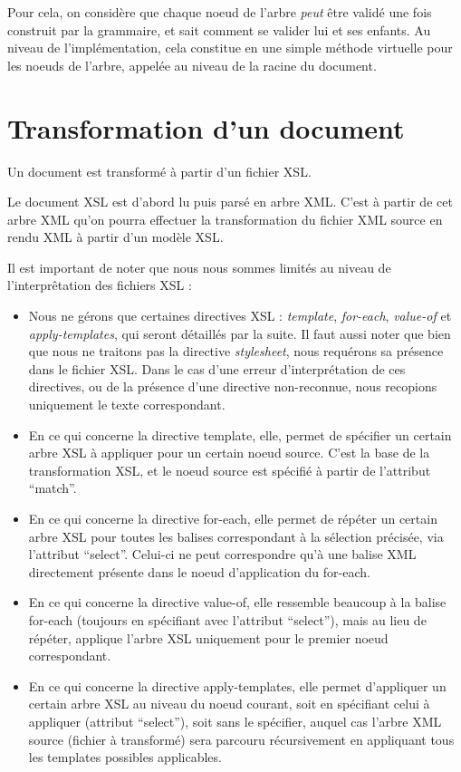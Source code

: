 \documentclass[10pt, a4paper]{article}
\begin{document}
Pour cela, on considère que chaque noeud de l'arbre \emph{peut} être
validé une fois construit par la grammaire, et sait comment se valider
lui et ses enfants. Au niveau de l'implémentation, cela constitue en une
simple méthode virtuelle pour les noeuds de l'arbre, appelée au niveau
de la racine du document.

\section{Transformation d'un
document}\label{transformation-dun-document}

Un document est transformé à partir d'un fichier XSL.

Le document XSL est d'abord lu puis parsé en arbre XML. C'est à partir
de cet arbre XML qu'on pourra effectuer la transformation du fichier XML
source en rendu XML à partir d'un modèle XSL.

Il est important de noter que nous nous sommes limités au niveau de
l'interprêtation des fichiers XSL :

\begin{itemize}
\itemsep1pt\parskip0pt
\item
  Nous ne gérons que certaines directives XSL : \emph{template},
  \emph{for-each}, \emph{value-of} et \emph{apply-templates}, qui seront
  détaillés par la suite. Il faut aussi noter que bien que nous ne
  traitons pas la directive \emph{stylesheet}, nous requérons sa
  présence dans le fichier XSL. Dans le cas d'une erreur
  d'interprétation de ces directives, ou de la présence d'une directive
  non-reconnue, nous recopions uniquement le texte correspondant.
\item
  En ce qui concerne la directive template, elle, permet de spécifier un
  certain arbre XSL à appliquer pour un certain noeud source. C'est la
  base de la transformation XSL, et le noeud source est spécifié à
  partir de l'attribut ``match''.
\item
  En ce qui concerne la directive for-each, elle permet de répéter un
  certain arbre XSL pour toutes les balises correspondant à la sélection
  précisée, via l'attribut ``select''. Celui-ci ne peut correspondre
  qu'à une balise XML directement présente dans le noeud d'application
  du for-each.
\item
  En ce qui concerne la directive value-of, elle ressemble beaucoup à la
  balise for-each (toujours en spécifiant avec l'attribut ``select''),
  mais au lieu de répéter, applique l'arbre XSL uniquement pour le
  premier noeud correspondant.
\item
  En ce qui concerne la directive apply-templates, elle permet
  d'appliquer un certain arbre XSL au niveau du noeud courant, soit en
  spécifiant celui à appliquer (attribut ``select''), soit sans le
  spécifier, auquel cas l'arbre XML source (fichier à transformé) sera
  parcouru récursivement en appliquant tous les templates possibles
  applicables.
\end{itemize}
\end{document}

